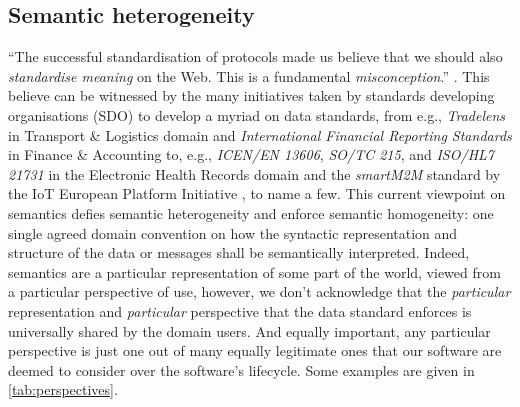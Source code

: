 \documentclass[sort&compress,preprint,authoryear,3p,twocolumn]{elsarticle}
\begin{document}
\hypertarget{semantic-heterogeneity}{%
\subsection{Semantic heterogeneity}\label{semantic-heterogeneity}}

``The successful standardisation of protocols made us believe that we
should also \emph{standardise meaning} on the Web. This is a fundamental
\emph{misconception}.'' \citep{Janowicz:2013ui}. This believe can be
witnessed by the many initiatives taken by standards developing
organisations (SDO) to develop a myriad on data standards, from e.g.,
\emph{Tradelens} in Transport \& Logistics domain and
\emph{International Financial Reporting Standards} in Finance \&
Accounting to, e.g., \emph{ICEN/EN 13606}, \emph{SO/TC 215}, and
\emph{ISO/HL7 21731} in the Electronic Health Records domain and the
\emph{smartM2M} standard by the IoT European Platform Initiative
\citep{ETSI2019}, to name a few. This current viewpoint on semantics
defies semantic heterogeneity and enforce semantic homogeneity: one
single agreed domain convention on how the syntactic representation and
structure of the data or messages shall be semantically interpreted.
Indeed, semantics are a particular representation of some part of the
world, viewed from a particular perspective of use, however, we don't
acknowledge that the \emph{particular} representation and
\emph{particular} perspective that the data standard enforces is
universally shared by the domain users. And equally important, any
particular perspective is just one out of many equally legitimate ones
that our software are deemed to consider over the software's lifecycle.
Some examples are given in \cref{tab:perspectives}.
\end{document}
